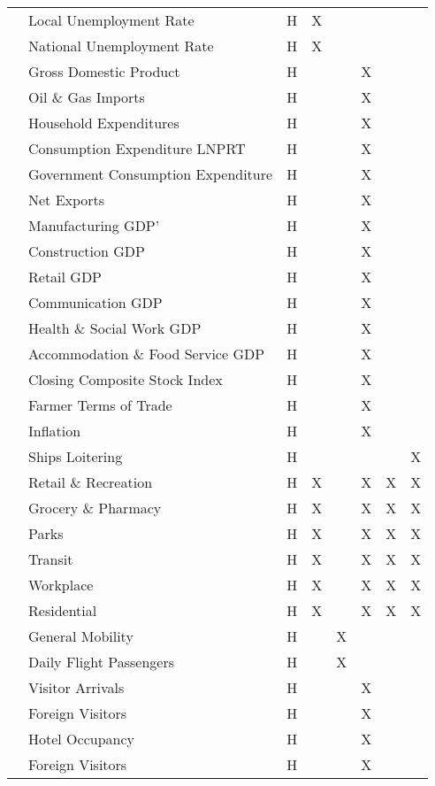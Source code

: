 \begin{center}
\begin{longtable}{|C{1.25cm}|C{2.5cm}|C{0.75cm}|C{1cm}|C{1cm}|C{1cm}|C{1.25cm}|C{1cm}|}
 & Local Unemployment Rate & H & X & & & & \\* 
& National Unemployment Rate & H & X & & & & \\* 
& Gross Domestic Product & H & & & X & & \\* 
& Oil \& Gas Imports & H & & & X & & \\* 
& Household Expenditures & H & & & X & & \\* 
& Consumption Expenditure LNPRT & H & & & X & & \\* 
& Government Consumption Expenditure & H & & & X & & \\* 
& Net Exports & H & & & X & & \\* 
& Manufacturing GDP' & H & & & X & & \\* 
& Construction GDP & H & & & X & & \\* 
& Retail GDP & H & & & X & & \\* 
& Communication GDP & H & & & X & & \\* 
& Health \& Social Work GDP & H & & & X & & \\* 
& Accommodation \& Food Service GDP & H & & & X & & \\* 
& Closing Composite Stock Index & H & & & X & & \\* 
& Farmer Terms of Trade & H & & & X & & \\* 
& Inflation & H & & & X & & \\* 
& Ships Loitering & H & & & & & X \\ \hline

 & Retail \& Recreation & H & X  & & X & X & X \\* 
& Grocery \& Pharmacy & H & X & & X & X & X\\* 
& Parks & H & X  & & X & X & X\\* 
& Transit & H & X  & & X & X & X \\* 
& Workplace & H & X  & & X & X & X\\* 
& Residential & H & X  & & X & X & X\\* 
& General Mobility & H & & X & & & \\* 
& Daily Flight Passengers & H & & X & & & \\* 
& Visitor Arrivals & H & & & X & & \\* 
& Foreign Visitors & H & & & X & & \\* 
& Hotel Occupancy & H & & & X & & \\* 
& Foreign Visitors & H & & & X & & \\ \hline

\end{longtable}
\end{center}
